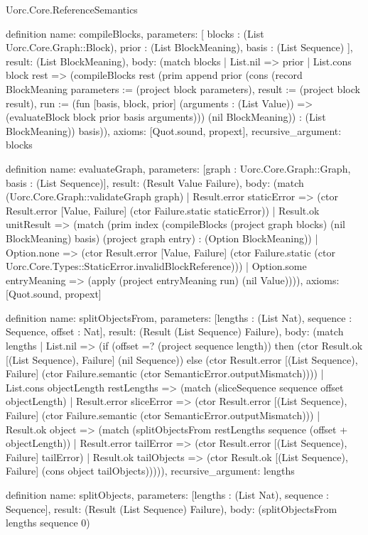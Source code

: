 \begin{lexlean}{Uorc.Core.ReferenceSemantics}
\begin{semanticmodule}
definition{
  name: compileBlocks,
  parameters: [
    blocks : (List Uorc.Core.Graph::Block),
    prior : (List BlockMeaning),
    basis : (List Sequence)
  ],
  result: (List BlockMeaning),
  body: (match blocks
    | List.nil => prior
    | List.cons block rest => (compileBlocks rest (prim append prior (cons (record BlockMeaning {parameters := (project block parameters), result := (project block result), run := (fun [basis, block, prior] (arguments : (List Value)) => (evaluateBlock block prior basis arguments))}) (nil BlockMeaning)) : (List BlockMeaning)) basis)),
  axioms: [Quot.sound, propext],
  recursive_argument: blocks
}

definition{
  name: evaluateGraph,
  parameters: [graph : Uorc.Core.Graph::Graph, basis : (List Sequence)],
  result: (Result Value Failure),
  body: (match (Uorc.Core.Graph::validateGraph graph)
    | Result.error staticError => (ctor Result.error [Value, Failure] (ctor Failure.static staticError))
    | Result.ok unitResult => (match (prim index (compileBlocks (project graph blocks) (nil BlockMeaning) basis) (project graph entry) : (Option BlockMeaning))
      | Option.none => (ctor Result.error [Value, Failure] (ctor Failure.static (ctor Uorc.Core.Types::StaticError.invalidBlockReference)))
      | Option.some entryMeaning => (apply (project entryMeaning run) (nil Value)))),
  axioms: [Quot.sound, propext]
}

definition{
  name: splitObjectsFrom,
  parameters: [lengths : (List Nat), sequence : Sequence, offset : Nat],
  result: (Result (List Sequence) Failure),
  body: (match lengths
    | List.nil => (if (offset =? (project sequence length)) then (ctor Result.ok [(List Sequence), Failure] (nil Sequence)) else (ctor Result.error [(List Sequence), Failure] (ctor Failure.semantic (ctor SemanticError.outputMismatch))))
    | List.cons objectLength restLengths => (match (sliceSequence sequence offset objectLength)
      | Result.error sliceError => (ctor Result.error [(List Sequence), Failure] (ctor Failure.semantic (ctor SemanticError.outputMismatch)))
      | Result.ok object => (match (splitObjectsFrom restLengths sequence (offset + objectLength))
        | Result.error tailError => (ctor Result.error [(List Sequence), Failure] tailError)
        | Result.ok tailObjects => (ctor Result.ok [(List Sequence), Failure] (cons object tailObjects))))),
  recursive_argument: lengths
}

definition{
  name: splitObjects,
  parameters: [lengths : (List Nat), sequence : Sequence],
  result: (Result (List Sequence) Failure),
  body: (splitObjectsFrom lengths sequence 0)
}


\end{semanticmodule}
\end{lexlean}
